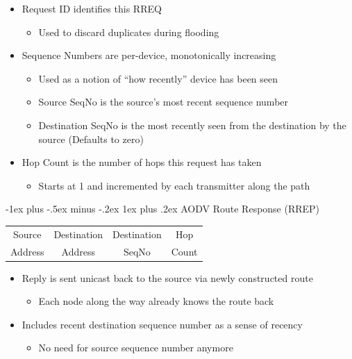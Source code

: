 \documentclass[10pt,landscape]{article}
\makeatletter
\newcommand{\subsubsubsection}{\@startsection{subsubsection}{3}{0mm}%
                                {-1ex plus -.5ex minus -.2ex}%
                                {1ex plus .2ex}%
                                {\normalfont\scriptsize\bfseries}}
\newcommand{\1}{\mathmybb{1}}
\makeatother
\begin{document}
\begin{multicols*}{3}
\begin{itemize}
  \item Request ID identifies this RREQ
  \begin{itemize}
    \item Used to discard duplicates during flooding
  \end{itemize}
  \item Sequence Numbers are per-device, monotonically increasing
  \begin{itemize}
    \item Used as a notion of ``how recently'' device has been seen
    \item Source SeqNo is the source's most recent sequence number
    \item Destination SeqNo is the most recently seen from the destination by the source (Defaults to zero)
  \end{itemize}
  \item Hop Count is the number of hops this request has taken
  \begin{itemize}
    \item Starts at 1 and incremented by each transmitter along the path
  \end{itemize}
\end{itemize}

\subsubsubsection{AODV Route Response (RREP)}
\begin{center}
  \begin{tabular}{|c|c|c|c|}
  \hline
  Source & Destination & Destination & \cellcolor{orange!60}Hop \\
  Address & Address & SeqNo & \cellcolor{orange!60}Count \\
  \hline
  \end{tabular}
\end{center}

\begin{itemize}
  \item Reply is sent unicast back to the source via newly constructed route
  \begin{itemize}
    \item Each node along the way already knows the route back
  \end{itemize}
  \item Includes recent destination sequence number as a sense of recency
  \begin{itemize}
    \item No need for source sequence number anymore
  \end{itemize}
\end{itemize}



\end{multicols*}
\end{document}
